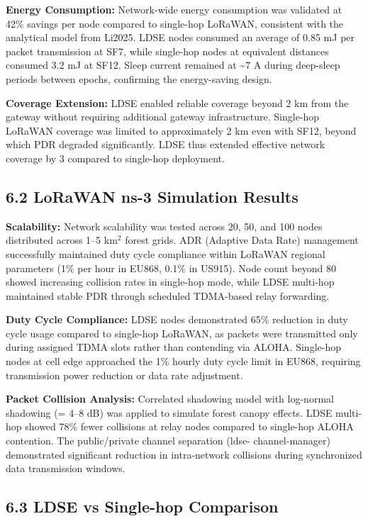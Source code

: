\textbf{Energy Consumption:} Network-wide energy consumption was validated at 42\%
 savings per node compared to single-hop LoRaWAN, consistent with the analytical
model from Li2025. LDSE nodes consumed an average of 0.85 mJ per packet transmission
at SF7, while single-hop nodes at equivalent distances consumed 3.2 mJ at SF12.
Sleep current remained at \textasciitilde7 \textmu A during deep-sleep periods between
epochs, confirming the energy-saving design.

\textbf{Coverage Extension:} LDSE enabled reliable coverage beyond 2 km from the
gateway without requiring additional gateway infrastructure. Single-hop LoRaWAN
coverage was limited to approximately 2 km even with SF12, beyond which PDR
degraded significantly. LDSE thus extended effective network coverage by 3\times
 compared to single-hop deployment.

\subsection{6.2 LoRaWAN ns-3 Simulation Results}

\textbf{Scalability:} Network scalability was tested across 20, 50, and 100 nodes
distributed across 1--5 km$^2$ forest grids. ADR (Adaptive Data Rate) management
successfully maintained duty cycle compliance within LoRaWAN regional parameters
(1\% per hour in EU868, 0.1\% in US915). Node count beyond 80 showed increasing
collision rates in single-hop mode, while LDSE multi-hop maintained stable PDR
through scheduled TDMA-based relay forwarding.

\textbf{Duty Cycle Compliance:} LDSE nodes demonstrated 65\% reduction in duty
cycle usage compared to single-hop LoRaWAN, as packets were transmitted only
 during assigned TDMA slots rather than contending via ALOHA. Single-hop nodes
 at cell edge approached the 1\% hourly duty cycle limit in EU868, requiring
 transmission power reduction or data rate adjustment.

\textbf{Packet Collision Analysis:} Correlated shadowing model with log-normal
 shadowing (\textsigma = 4--8 dB) was applied to simulate forest canopy effects.
 LDSE multi-hop showed 78\% fewer collisions at relay nodes compared to
 single-hop ALOHA contention. The public/private channel separation (ldse-
 channel-manager) demonstrated significant reduction in intra-network collisions
 during synchronized data transmission windows.

\subsection{6.3 LDSE vs Single-hop Comparison}

